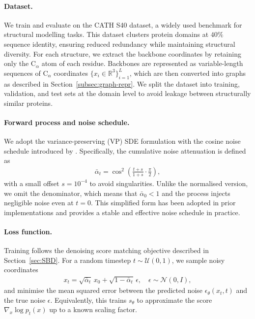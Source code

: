 \documentclass[a4paper,12pt]{article}
\begin{document}
\paragraph{Dataset.}
We train and evaluate on the CATH S40 dataset, a widely used benchmark for structural modelling tasks. 
This dataset clusters protein domains at \(40\%\) sequence identity, ensuring reduced redundancy while maintaining structural diversity. 
For each structure, we extract the backbone coordinates by retaining only the C\(_\alpha\) atom of each residue. 
Backbones are represented as variable-length sequences of C\(_\alpha\) coordinates \(\{x_i \in \mathbb{R}^3\}_{i=1}^L\), which are then converted into graphs as described in Section~\ref{subsec:graph-repr}. 
We split the dataset into training, validation, and test sets at the domain level to avoid leakage between structurally similar proteins.

\paragraph{Forward process and noise schedule.}
We adopt the variance-preserving (VP) SDE formulation with the cosine noise schedule introduced by \cite{nicholImprovedDenoisingDiffusion2021}. Specifically, the cumulative noise attenuation is defined as
\begin{align*}
    \bar \alpha_t = \cos^2\!\left(\frac{t+s}{1+s}\cdot \frac{\pi}{2}\right),
\end{align*}
with a small offset \(s = 10^{-4}\) to avoid singularities. Unlike the normalised version, we omit the denominator, which means that \(\bar\alpha_0 < 1\) and the process injects negligible noise even at \(t=0\). This simplified form has been adopted in prior implementations and provides a stable and effective noise schedule in practice. 

\paragraph{Loss function.}
Training follows the denoising score matching objective described in Section~\ref{sec:SBD}. For a random timestep \(t \sim \mathcal{U}(0,1)\), we sample noisy coordinates
\begin{align*}
    x_t = \sqrt{\bar\alpha_t}\,x_0 + \sqrt{1-\bar\alpha_t}\,\epsilon, \quad \epsilon \sim \mathcal{N}(0,I),
\end{align*}
and minimise the mean squared error between the predicted noise \(\epsilon_\theta(x_t, t)\) and the true noise \(\epsilon\). 
Equivalently, this trains \(s_\theta\) to approximate the score \(\nabla_x \log p_t(x)\) up to a known scaling factor.
\end{document}
